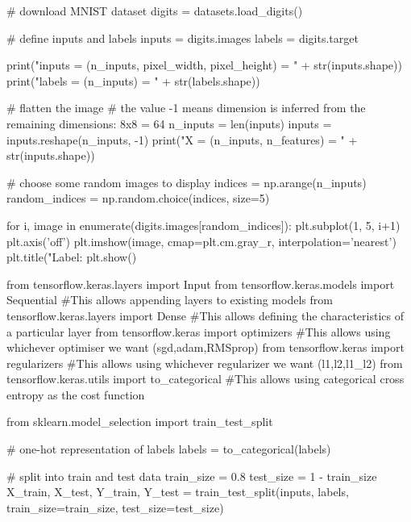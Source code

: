 \documentclass[%
oneside,                 %
final,                   %
10pt]{article}
\begin{document}
# download MNIST dataset
digits = datasets.load_digits()

# define inputs and labels
inputs = digits.images
labels = digits.target

print("inputs = (n_inputs, pixel_width, pixel_height) = " + str(inputs.shape))
print("labels = (n_inputs) = " + str(labels.shape))


# flatten the image
# the value -1 means dimension is inferred from the remaining dimensions: 8x8 = 64
n_inputs = len(inputs)
inputs = inputs.reshape(n_inputs, -1)
print("X = (n_inputs, n_features) = " + str(inputs.shape))


# choose some random images to display
indices = np.arange(n_inputs)
random_indices = np.random.choice(indices, size=5)

for i, image in enumerate(digits.images[random_indices]):
    plt.subplot(1, 5, i+1)
    plt.axis('off')
    plt.imshow(image, cmap=plt.cm.gray_r, interpolation='nearest')
    plt.title("Label: %
plt.show()

\epycod




















\bpycod
from tensorflow.keras.layers import Input
from tensorflow.keras.models import Sequential      #This allows appending layers to existing models
from tensorflow.keras.layers import Dense           #This allows defining the characteristics of a particular layer
from tensorflow.keras import optimizers             #This allows using whichever optimiser we want (sgd,adam,RMSprop)
from tensorflow.keras import regularizers           #This allows using whichever regularizer we want (l1,l2,l1_l2)
from tensorflow.keras.utils import to_categorical   #This allows using categorical cross entropy as the cost function

from sklearn.model_selection import train_test_split

# one-hot representation of labels
labels = to_categorical(labels)

# split into train and test data
train_size = 0.8
test_size = 1 - train_size
X_train, X_test, Y_train, Y_test = train_test_split(inputs, labels, train_size=train_size,
                                                    test_size=test_size)
\end{document}
